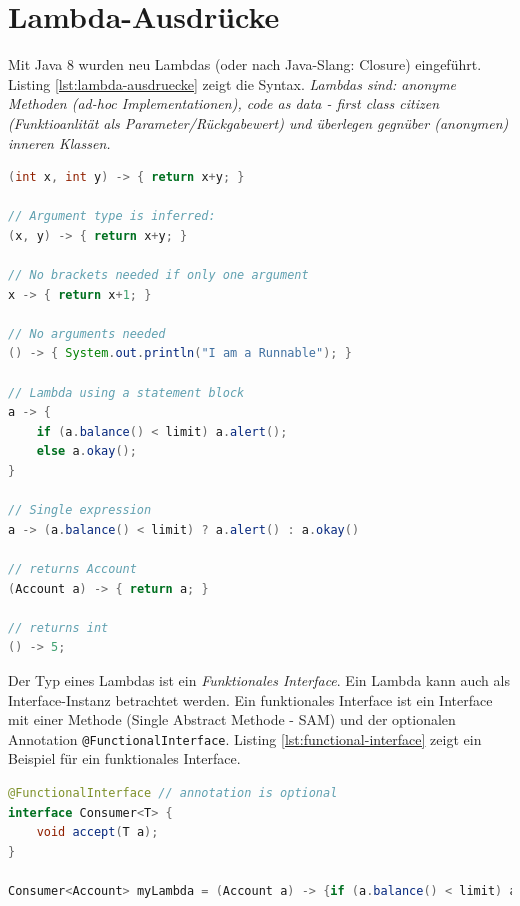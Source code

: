 \section{Lambda-Ausdrücke}

Mit Java 8 wurden neu Lambdas (oder nach Java-Slang: Closure) eingeführt. Listing \ref{lst:lambda-ausdruecke} zeigt die Syntax. \textit{Lambdas sind: anonyme Methoden (ad-hoc Implementationen), code as data - first class citizen (Funktioanlität als Parameter/Rückgabewert) und überlegen gegnüber (anonymen) inneren Klassen.}

\begin{lstlisting}[language=Java, caption=Lambda-Ausdrücke, label=lst:lambda-ausdruecke]
(int x, int y) -> { return x+y; }

// Argument type is inferred:
(x, y) -> { return x+y; }

// No brackets needed if only one argument
x -> { return x+1; }

// No arguments needed
() -> { System.out.println("I am a Runnable"); }

// Lambda using a statement block
a -> {
	if (a.balance() < limit) a.alert();
	else a.okay();
}

// Single expression
a -> (a.balance() < limit) ? a.alert() : a.okay()

// returns Account
(Account a) -> { return a; }

// returns int
() -> 5;
\end{lstlisting}

Der Typ eines Lambdas ist ein \textit{Funktionales Interface}. Ein Lambda kann auch als Interface-Instanz betrachtet werden. Ein funktionales Interface ist ein Interface mit einer Methode (Single Abstract Methode - SAM) und der optionalen Annotation \verb|@FunctionalInterface|. Listing \ref{lst:functional-interface} zeigt ein Beispiel für ein funktionales Interface.

\begin{lstlisting}[language=Java, caption=functional interface (SAM), label=lst:functional-interface]
@FunctionalInterface // annotation is optional
interface Consumer<T> {
	void accept(T a);
}

Consumer<Account> myLambda = (Account a) -> {if (a.balance() < limit) a.alert(); };
\end{lstlisting}

